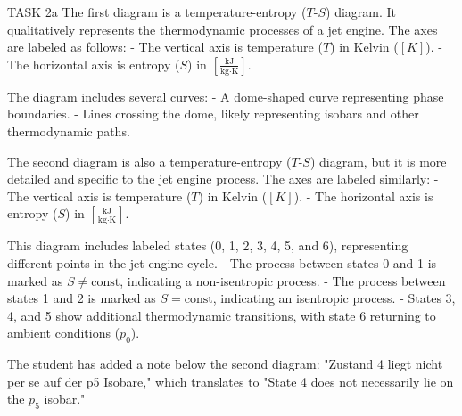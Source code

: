 TASK 2a  
The first diagram is a temperature-entropy (\( T \)-\( S \)) diagram. It qualitatively represents the thermodynamic processes of a jet engine. The axes are labeled as follows:  
- The vertical axis is temperature (\( T \)) in Kelvin (\( [K] \)).  
- The horizontal axis is entropy (\( S \)) in \( \left[\frac{\text{kJ}}{\text{kg·K}}\right] \).  

The diagram includes several curves:  
- A dome-shaped curve representing phase boundaries.  
- Lines crossing the dome, likely representing isobars and other thermodynamic paths.  

The second diagram is also a temperature-entropy (\( T \)-\( S \)) diagram, but it is more detailed and specific to the jet engine process. The axes are labeled similarly:  
- The vertical axis is temperature (\( T \)) in Kelvin (\( [K] \)).  
- The horizontal axis is entropy (\( S \)) in \( \left[\frac{\text{kJ}}{\text{kg·K}}\right] \).  

This diagram includes labeled states (0, 1, 2, 3, 4, 5, and 6), representing different points in the jet engine cycle.  
- The process between states 0 and 1 is marked as \( S \neq \text{const} \), indicating a non-isentropic process.  
- The process between states 1 and 2 is marked as \( S = \text{const} \), indicating an isentropic process.  
- States 3, 4, and 5 show additional thermodynamic transitions, with state 6 returning to ambient conditions (\( p_0 \)).  

The student has added a note below the second diagram:  
"Zustand 4 liegt nicht per se auf der p5 Isobare," which translates to "State 4 does not necessarily lie on the \( p_5 \) isobar."